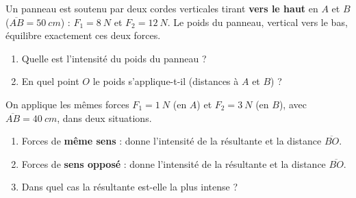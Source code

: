 \documentclass[11pt,a4paper]{article}
\newcommand{\vv}[1]{\vec{#1}}\newcommand{\ds}{\displaystyle}
\begin{document}
\begin{exo}
Un panneau est soutenu par deux cordes verticales tirant \textbf{vers le haut} en $A$ et $B$
($\overline{AB}=\qty{50}{cm}$) : $F_1=\qty{8}{N}$ et $F_2=\qty{12}{N}$. Le poids du panneau, vertical
vers le bas, équilibre exactement ces deux forces.
\begin{center}
\end{center}
\begin{enumerate}[label=\alph*)]
  \item Quelle est l'intensité du poids du panneau ?
  \item En quel point $O$ le poids s'applique-t-il (distances à $A$ et $B$) ?
\end{enumerate}
\end{exo}

\begin{exo}
On applique les mêmes forces $F_1=\qty{1}{N}$ (en $A$) et $F_2=\qty{3}{N}$ (en $B$), avec
$\overline{AB}=\qty{40}{cm}$, dans deux situations.
\begin{enumerate}[label=\alph*)]
  \item Forces de \textbf{même sens} : donne l'intensité de la résultante et la distance $\overline{BO}$.
  \item Forces de \textbf{sens opposé} : donne l'intensité de la résultante et la distance $\overline{BO}$.
  \item Dans quel cas la résultante est-elle la plus intense ?
\end{enumerate}
\end{exo}
\end{document}
